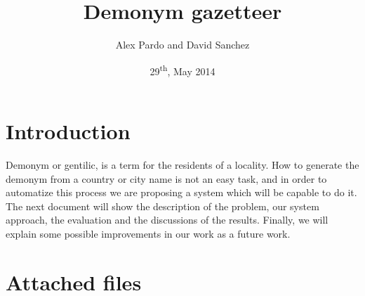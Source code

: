 \documentclass[]{article}
\title{Demonym gazetteer}
\date{29\textsuperscript{th}, May 2014}
\author{Alex Pardo and David Sanchez}
\begin{document}
\maketitle
\newpage
\tableofcontents

\newpage

\section{Introduction}

Demonym or gentilic, is a term for the residents of a locality. 
How to generate the demonym from a country or city name is not an easy task, and in order to automatize this process we are proposing a system which will be capable to do it. 
The next document will show the description of the problem, our system approach, the evaluation and the discussions of the results. Finally, we will explain some possible improvements in our work as a future work.

\section{Attached files}
\end{document}
